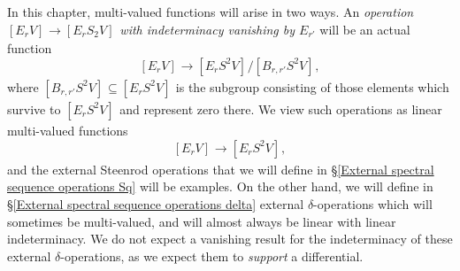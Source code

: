\documentclass[11pt]{amsart} \renewcommand{\baselinestretch}{1.2}
\theoremstyle{plain}
\numberwithin{equation}{section} %
\theoremstyle{plain}
\numberwithin{equation}{chapter} %
\renewcommand{\to}{\longrightarrow}
\newcommand{\Edown}[4]{[E_{#1}#2]^{#3}_{#4}}
\newcommand{\EBdown}[4]{[B_{#1}#2]^{#3}_{#4}}
\begin{document}
\begin{second quadrant homotopy sseq operations}
In this chapter, multi-valued functions will arise in two ways. %
An \emph{operation $\Edown{r}{V}{}{}\to \Edown{r}{S_2V}{}{}$ with indeterminacy vanishing by $E_{r'}$} will be an actual function 
\[\Edown{r}{V}{}{}\to \Edown{r}{S^2V}{}{}/\EBdown{r,r'}{S^2V}{}{},\]
where $\EBdown{r,r'}{S^2V}{}{}\subseteq \Edown{r}{S^2V}{}{}$ is the subgroup consisting of those elements which survive to $\Edown{r}{S^2V}{}{}$ and represent zero there. We view such operations as linear multi-valued functions
\[\Edown{r}{V}{}{}\to \Edown{r}{S^2V}{}{},\]
and the external Steenrod operations that we will define in \S\ref{External spectral sequence operations Sq} will be examples.
On the other hand, we will define in \S\ref{External spectral sequence operations delta} external $\delta$-operations which will sometimes be multi-valued, and will almost always be linear with linear indeterminacy. We do not expect a vanishing result for the indeterminacy of these external $\delta$-operations, as we expect them to \emph{support} a differential. %



\end{second quadrant homotopy sseq operations}
\end{document}
